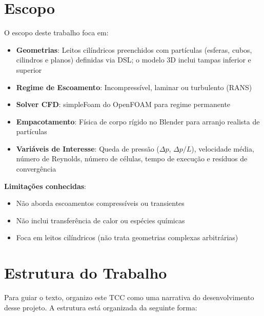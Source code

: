 \section{Escopo}

O escopo deste trabalho foca em:

\begin{itemize}
    \item \textbf{Geometrias}: Leitos cilíndricos preenchidos com partículas (esferas, cubos, cilindros e planos) definidas via DSL; o modelo 3D inclui tampas inferior e superior
    
    \item \textbf{Regime de Escoamento}: Incompressível, laminar ou turbulento (RANS)
    
    \item \textbf{Solver CFD}: simpleFoam do OpenFOAM para regime permanente
    
    \item \textbf{Empacotamento}: Física de corpo rígido no Blender para arranjo realista de partículas
    
    \item \textbf{Variáveis de Interesse}: Queda de pressão ($\Delta p$, $\Delta p/L$), velocidade média, número de Reynolds, número de células, tempo de execução e resíduos de convergência
\end{itemize}

\textbf{Limitações conhecidas}:
\begin{itemize}
    \item Não aborda escoamentos compressíveis ou transientes
    \item Não inclui transferência de calor ou espécies químicas
    \item Foca em leitos cilíndricos (não trata geometrias complexas arbitrárias)
\end{itemize}

\section{Estrutura do Trabalho}

Para guiar o texto, organizo este TCC como uma narrativa do desenvolvimento desse projeto. A estrutura está organizada da seguinte forma:

